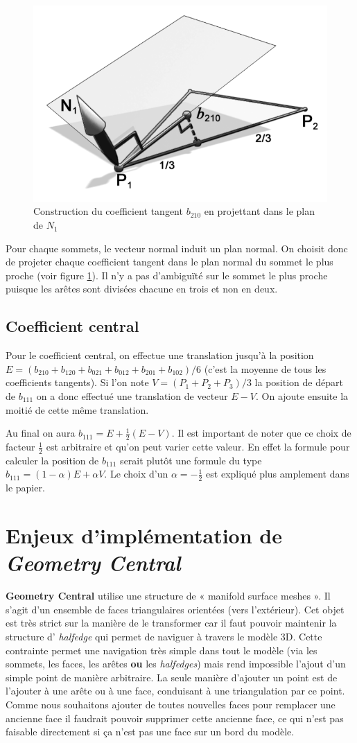 \documentclass{article}
\begin{document}
\begin{figure}[ht!]
\centering
    \includegraphics[width=0.4\linewidth]{tangent}
    \caption{Construction du coefficient tangent $b_210$ en projettant dans le
plan de $N_1$}
    \label{fig:tangent}
\end{figure}

Pour chaque sommets, le vecteur normal induit un plan normal. On choisit donc
de projeter chaque coefficient tangent dans le plan normal du sommet le plus
proche (voir figure \ref{fig:tangent}). Il n'y a pas d’ambiguïté sur le sommet
le plus proche puisque les arêtes sont divisées chacune en trois et non en
deux.

\subsection{Coefficient central}
Pour le coefficient central, on effectue une translation jusqu'à la position
$E=(b_{210} + b_{120} + b_{021} + b_{012} + b_{201} + b_{102})/6$ (c'est la
moyenne de tous les coefficients tangents). Si l'on note $V=(P_1 + P_2 +
P_3)/3$ la position de départ de $b_{111}$ on a donc effectué une translation
de vecteur $E-V$. On ajoute ensuite la moitié de cette même translation.

Au final on aura $b_{111} = E + \frac{1}{2}(E-V)$. Il est important de noter
que ce choix de facteur $\frac{1}{2}$ est arbitraire et qu'on peut varier cette
valeur. En effet la formule pour calculer la position de $b_{111}$ serait
plutôt une formule du type $b_{111} = (1-\alpha)E + \alpha V$. Le choix d'un
$\alpha = -\frac{1}{2}$ est expliqué plus amplement dans le papier.


\section{Enjeux d'implémentation de \textit{Geometry Central}}

\textbf{Geometry Central} utilise une structure de « manifold surface meshes ».
Il s'agit d'un ensemble de faces triangulaires orientées (vers l'extérieur).
Cet objet est très strict sur la manière de le transformer car il faut pouvoir
maintenir la structure d' \textit{halfedge} qui permet de naviguer à travers le
modèle 3D. Cette contrainte permet une navigation très simple dans tout le
modèle (via les sommets, les faces, les arêtes \textbf{ou} les
\textit{halfedges}) mais rend impossible l'ajout d'un simple point de manière
arbitraire. La seule manière d'ajouter un point est de l'ajouter à une arête ou
à une face, conduisant à une triangulation par ce point. Comme nous souhaitons
ajouter de toutes nouvelles faces pour remplacer une ancienne face il faudrait
pouvoir supprimer cette ancienne face, ce qui n'est pas faisable directement si
ça n'est pas une face sur un bord du modèle.
\end{document}
